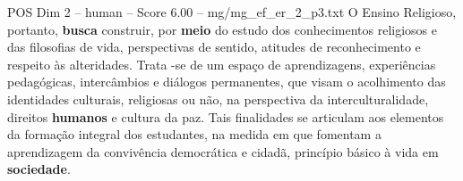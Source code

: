 \begin{textsample}{POS Dim 2 – human – Score 6.00 – mg/mg\_ef\_er\_2\_p3.txt}  \label{ex:f2_pos_013}
O Ensino Religioso, portanto, \textbf{busca} construir, por \textbf{meio} do estudo dos conhecimentos religiosos e das filosofias de vida, perspectivas de sentido, atitudes de reconhecimento e respeito às alteridades.
Trata -se de um espaço de aprendizagens, experiências pedagógicas, intercâmbios e diálogos permanentes, que visam o acolhimento das identidades culturais, religiosas ou não, na perspectiva da interculturalidade, direitos \textbf{humanos} e cultura da paz.
Tais finalidades se articulam aos elementos da formação integral dos estudantes, na medida em que fomentam a aprendizagem da convivência democrática e cidadã, princípio básico à vida em \textbf{sociedade}.

\end{textsample}

